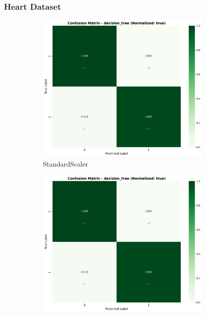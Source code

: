 \FloatBarrier

\subsubsection{Heart Dataset}\label{subsubsec:dt-heart}

\begin{figure}[H]
\centering
\begin{subfigure}[b]{0.31\textwidth}\centering
\includegraphics[width=0.95\textwidth]{Result/heart_dataset/confusion_matrices/decision_tree_numeric_dataset_StandardScaler.png}
\caption{StandardScaler}\label{fig:dt_heart_cm_standard}
\end{subfigure}\hfill
\begin{subfigure}[b]{0.31\textwidth}\centering
\includegraphics[width=0.95\textwidth]{Result/heart_dataset/confusion_matrices/decision_tree_numeric_dataset_MinMaxScaler.png}

\end{subfigure}
\end{figure}
